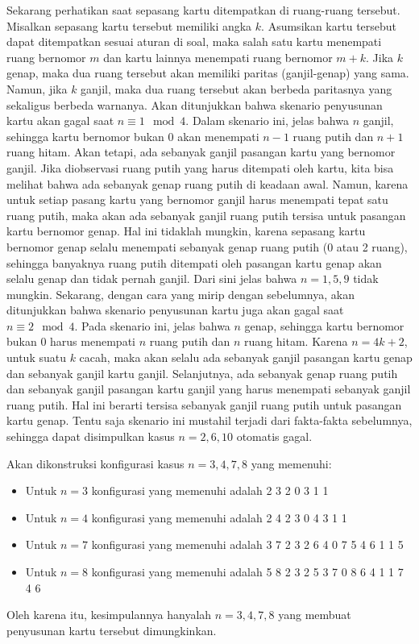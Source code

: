 \documentclass[11pt]{scrartcl}
\begin{document}
\begin{soaljawab}
\begin{solusi}
        \vspace{10pt}
        Sekarang perhatikan saat sepasang kartu ditempatkan di ruang-ruang tersebut. Misalkan sepasang kartu tersebut memiliki angka $k$. Asumsikan kartu tersebut dapat ditempatkan sesuai aturan di soal, maka salah satu kartu menempati ruang bernomor $m$ dan kartu lainnya menempati ruang bernomor $m+k$. Jika $k$ genap, maka dua ruang tersebut akan memiliki paritas (ganjil-genap) yang sama. Namun, jika $k$ ganjil, maka dua ruang tersebut akan berbeda paritasnya yang sekaligus berbeda warnanya.
        \vspace{10pt}
        Akan ditunjukkan bahwa skenario penyusunan kartu akan gagal saat $n \equiv 1 \mod 4$. Dalam skenario ini, jelas bahwa $n$ ganjil, sehingga kartu bernomor bukan 0 akan menempati $n-1$ ruang putih dan $n+1$ ruang hitam. Akan tetapi, ada sebanyak ganjil pasangan kartu yang bernomor ganjil. Jika diobservasi ruang putih yang harus ditempati oleh kartu, kita bisa melihat bahwa ada sebanyak genap ruang putih di keadaan awal. Namun, karena untuk setiap pasang kartu yang bernomor ganjil harus menempati tepat satu ruang putih, maka akan ada sebanyak ganjil ruang putih tersisa untuk pasangan kartu bernomor genap. Hal ini tidaklah mungkin, karena sepasang kartu bernomor genap selalu menempati sebanyak genap ruang putih (0 atau 2 ruang), sehingga banyaknya ruang putih ditempati oleh pasangan kartu genap akan selalu genap dan tidak pernah ganjil. Dari sini jelas bahwa $n=1,5,9$ tidak mungkin.
        \vspace{10pt}
        Sekarang, dengan cara yang mirip dengan sebelumnya, akan ditunjukkan bahwa skenario penyusunan kartu juga akan gagal saat $n \equiv 2 \mod 4$. Pada skenario ini, jelas bahwa $n$ genap, sehingga kartu bernomor bukan 0 harus menempati $n$ ruang putih dan $n$ ruang hitam. Karena $n=4k+2$, untuk suatu $k$ cacah, maka akan selalu ada sebanyak ganjil pasangan kartu genap dan sebanyak ganjil kartu ganjil. Selanjutnya, ada sebanyak genap ruang putih dan sebanyak ganjil pasangan kartu ganjil yang harus menempati sebanyak ganjil ruang putih. Hal ini berarti tersisa sebanyak ganjil ruang putih untuk pasangan kartu genap. Tentu saja skenario ini mustahil terjadi dari fakta-fakta sebelumnya, sehingga dapat disimpulkan kasus $n=2,6,10$ otomatis gagal.

        Akan dikonstruksi konfigurasi kasus $n=3,4,7,8$ yang memenuhi:
        \begin{itemize}
            \item Untuk $n=3$ konfigurasi yang memenuhi adalah 2 3 2 0 3 1 1
            \item Untuk $n=4$ konfigurasi yang memenuhi adalah 2 4 2 3 0 4 3 1 1
            \item Untuk $n=7$ konfigurasi yang memenuhi adalah 3 7 2 3 2 6 4 0 7 5 4 6 1 1 5
            \item Untuk $n=8$ konfigurasi yang memenuhi adalah 5 8 2 3 2 5 3 7 0 8 6 4 1 1 7 4 6
        \end{itemize}
        Oleh karena itu, kesimpulannya hanyalah $n=3,4,7,8$ yang membuat penyusunan kartu tersebut dimungkinkan.
    \end{solusi}
\end{soaljawab}
\end{document}
